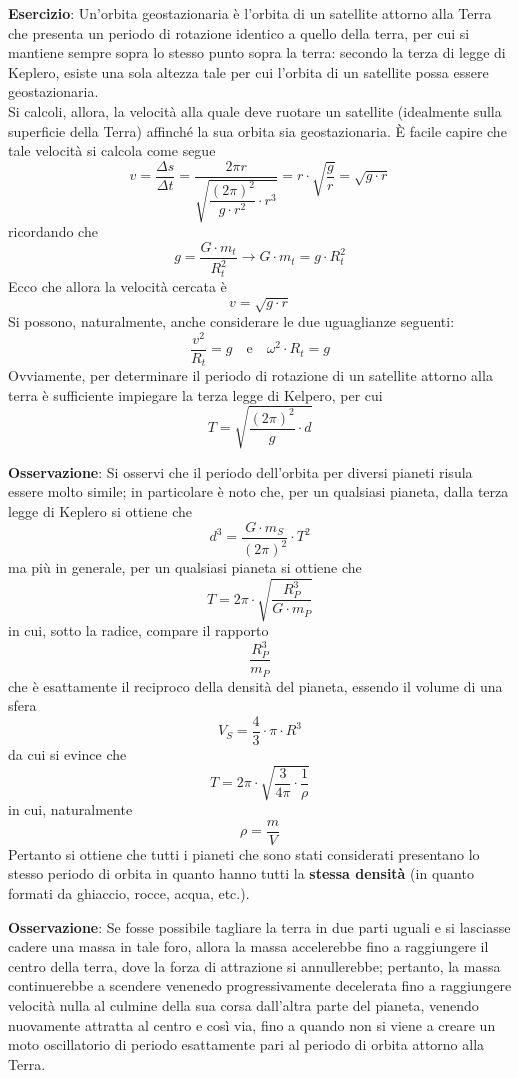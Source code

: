 \documentclass[a4paper]{extarticle}
\begin{document}
\vspace{1em}
\noindent
\textbf{Esercizio}: Un'orbita geostazionaria è l'orbita di un satellite attorno alla Terra che presenta un periodo di rotazione identico a quello della terra, per cui si mantiene sempre sopra lo stesso punto sopra la terra: secondo la terza di legge di Keplero, esiste una sola altezza tale per cui l'orbita di un satellite possa essere geostazionaria.\\
Si calcoli, allora, la velocità alla quale deve ruotare un satellite (idealmente sulla superficie della Terra) affinché la sua orbita sia geostazionaria. È facile capire che tale velocità si calcola come segue
\[v = \frac{\Delta s}{\Delta t} = \frac{2 \pi r}{\sqrt{\dfrac{(2 \pi)^2}{g \cdot r^2} \cdot r^3}} = r \cdot \sqrt{\frac{g}{r}} = \sqrt{g \cdot r}\]
ricordando che
\[g=\frac{G \cdot m_t}{R_t^2} \longrightarrow G \cdot m_t = g \cdot R_t^2\]
Ecco che allora la velocità cercata è
\[\boxed{v = \sqrt{g \cdot r}}\]
Si possono, naturalmente, anche considerare le due uguaglianze seguenti:
\[\boxed{\frac{v^2}{R_t} = g} \hspace{1em} \text{e} \hspace{1em} \boxed{\omega^2 \cdot R_t = g}\]
Ovviamente, per determinare il periodo di rotazione di un satellite attorno alla terra è sufficiente impiegare la terza legge di Kelpero, per cui
\[\boxed{T=\sqrt{\frac{(2\pi)^2}{g} \cdot d}}\]

\vspace{2em}
\noindent
\textbf{Osservazione}: Si osservi che il periodo dell'orbita per diversi pianeti risula essere molto simile; in particolare è noto che, per un qualsiasi pianeta, dalla terza legge di Keplero si ottiene che
\[d^3 = \frac{G \cdot m_S}{(2\pi)^2} \cdot T^2\]
ma più in generale, per un qualsiasi pianeta si ottiene che
\[T = 2\pi \cdot \sqrt{\frac{R_P^3}{G \cdot m_P}}\]
in cui, sotto la radice, compare il rapporto
\[\frac{R_P^3}{m_P}\]
che è esattamente il reciproco della densità del pianeta, essendo il volume di una sfera
\[V_S = \frac{4}{3} \cdot \pi \cdot R^3\]
da cui si evince che
\[T = 2\pi \cdot \sqrt{\frac{3}{4\pi} \cdot \frac{1}{\rho}}\]
in cui, naturalmente
\[\rho = \frac{m}{V}\]
Pertanto si ottiene che tutti i pianeti che sono stati considerati presentano lo stesso periodo di orbita in quanto hanno tutti la \textbf{stessa densità} (in quanto formati da ghiaccio, rocce, acqua, etc.).

\vspace{1em}
\noindent
\textbf{Osservazione}: Se fosse possibile tagliare la terra in due parti uguali e si lasciasse cadere una massa in tale foro, allora la massa accelerebbe fino a raggiungere il centro della terra, dove la forza di attrazione si annullerebbe; pertanto, la massa continuerebbe a scendere venenedo progressivamente decelerata fino a raggiungere velocità nulla al culmine della sua corsa dall'altra parte del pianeta, venendo nuovamente attratta al centro e così via, fino a quando non si viene a creare un moto oscillatorio di periodo esattamente pari al periodo di orbita attorno alla Terra.
\end{document}
